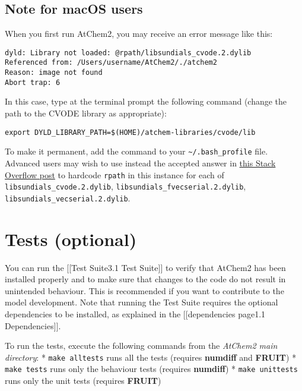 \subsection{Note for macOS users} \label{subsec:note-for-macos-users}

When you first run AtChem2, you may receive an error message like this:

\begin{verbatim}
dyld: Library not loaded: @rpath/libsundials_cvode.2.dylib
Referenced from: /Users/username/AtChem2/./atchem2
Reason: image not found
Abort trap: 6
\end{verbatim}

In this case, type at the terminal prompt the following command (change
the path to the CVODE library as appropriate):

\begin{verbatim}
export DYLD_LIBRARY_PATH=$(HOME)/atchem-libraries/cvode/lib
\end{verbatim}

To make it permanent, add the command to your
\texttt{\textasciitilde{}/.bash\_profile} file. Advanced users may wish
to use instead the accepted answer in
\href{https://stackoverflow.com/questions/17703510/dyld-library-not-loaded-reason-image-not-loaded}{this
Stack Overflow post} to hardcode \texttt{rpath} in this instance for
each of \texttt{libsundials\_cvode.2.dylib},
\texttt{libsundials\_fvecserial.2.dylib},
\texttt{libsundials\_vecserial.2.dylib}.

\section{Tests (optional)} \label{sec:tests}

You can run the {[}{[}Test Suite\textbar{}3.1 Test Suite{]}{]} to verify
that AtChem2 has been installed properly and to make sure that changes
to the code do not result in unintended behaviour. This is recommended
if you want to contribute to the model development. Note that running
the Test Suite requires the optional dependencies to be installed, as
explained in the {[}{[}dependencies page\textbar{}1.1
Dependencies{]}{]}.

To run the tests, execute the following commands from the \emph{AtChem2
main directory}: * \texttt{make\ alltests} runs all the tests (requires
\textbf{numdiff} and \textbf{FRUIT}) * \texttt{make\ tests} runs only
the behaviour tests (requires \textbf{numdiff}) *
\texttt{make\ unittests} runs only the unit tests (requires
\textbf{FRUIT})

